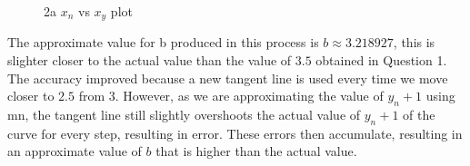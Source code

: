 \documentclass[answers,addpoints]{exam}
\begin{document}
\begin{questions}
\begin{solution}
    \begin{figure}[H]
      \centering
      \caption{2a $x_n$ vs $x_y$ plot}
      \label{fig:2a-vii-plot}
    \end{figure}

    The approximate value for b produced in this process is $b \approx 3.218927$, this is slighter closer to the actual value than the value of $3.5$ obtained in Question 1. The accuracy improved because a new tangent line is used every time we move closer to $2.5$ from $3$. However, as we are approximating the value of $y_n+1$ using mn, the tangent line still slightly overshoots the actual value of $y_n+1$ of the curve for every step, resulting in error. These errors then accumulate, resulting in an approximate value of $b$ that is higher than the actual value.


\end{solution}
\end{questions}
\end{document}
